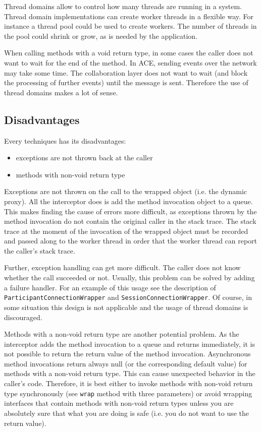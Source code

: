 Thread domains allow to control how many threads are running in a system.
Thread domain implementations can create worker threads in a flexible way. For
instance a thread pool could be used to create workers. The number of
threads in the pool could shrink or grow, as is needed by the application.

When calling methods with a void return type,
in some cases the caller does not want to wait for the end of the method.
In ACE, sending events over the network may take some time. The collaboration
layer does not want to wait (and block the processing of further events)
until the message is sent. Therefore the use of thread domains makes a
lot of sense.


\subsection{Disadvantages}
Every techniques has its disadvantages:

\begin{itemize}
 \item exceptions are not thrown back at the caller
 \item methods with non-void return type
\end{itemize}

Exceptions are not thrown on the call to the wrapped object (i.e. the
dynamic proxy). All the 
interceptor does is add the method invocation object to a queue. This makes
finding the cause of errors more difficult, as exceptions thrown by the
method invocation do not contain the original caller in the stack trace.
The stack trace at the moment of the invocation of the wrapped object must
be recorded and passed along to the worker thread in order that the worker
thread can report the caller's stack trace. 

Further, exception handling can get more difficult. The caller does not
know whether the call succeeded or not. Usually, this problem can be solved
by adding a failure handler. For an example of this usage see the
description of \texttt{ParticipantConnectionWrapper} and 
\texttt{SessionConnectionWrapper}. Of course, in some situation this
design is not applicable and the usage of thread domains is discouraged.

Methods with a non-void return type are another potential problem. As the
interceptor adds the method invocation to a queue and returns immediately,
it is not possible to return the return value of the method invocation.
Asynchronous method invocations return always null (or the corresponding
default value) for methods with a non-void return type. This can cause
unexpected behavior in the caller's code. Therefore, it is best either to
invoke methods with non-void return type synchronously (see \texttt{wrap}
method with three parameters) or avoid wrapping interfaces that contain
methods with non-void return types unless you are absolutely sure that
what you are doing is safe (i.e. you do not want to use the return value).


